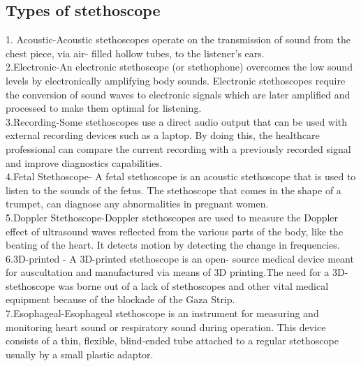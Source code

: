 \documentclass[12pt]{report}
\begin{document}
\subsection{Types of stethoscope}

 1. Acoustic-Acoustic stethoscopes operate on the  
   transmission of sound from the chest piece, via air-
   filled hollow tubes, to the listener's ears.\\
   
2.Electronic-An electronic stethoscope (or  
   stethophone)   
   overcomes the low sound levels by electronically   
   amplifying body sounds.
   Electronic stethoscopes require the conversion of   
   sound waves to electronic signals which are later 
   amplified and processed to make them optimal for 
   listening.\\

 
3.Recording-Some stethoscopes use a direct audio output 
  that can be used with external recording devices such  
  as a laptop. By doing this, the healthcare 
  professional can compare the current recording with a 
  previously recorded signal and improve diagnostics 
  capabilities.\\


4.Fetal Stethoscope- A fetal stethoscope is an acoustic 
  stethoscope that is used to listen to the sounds of  
  the fetus. The stethoscope that comes in the shape of 
  a trumpet, can diagnose any abnormalities in pregnant 
  women.\\


5.Doppler Stethoscope-Doppler stethoscopes are used to  
  measure the Doppler effect of ultrasound waves 
  reflected from the various parts of the body, like 
  the beating of the heart. It detects motion by 
  detecting the change in frequencies.\\


6.3D-printed - A 3D-printed stethoscope is an open-
  source medical device meant for auscultation and 
  manufactured via means of 3D printing.The need for a 
  3D-stethoscope was borne out of a lack of 
  stethoscopes and other vital medical equipment 
  because of the blockade of the Gaza Strip.\\


7.Esophageal-Esophageal stethoscope is an instrument 
  for measuring and monitoring heart sound or 
  respiratory sound during operation. This device 
  consists of a thin, flexible, blind-ended tube 
  attached to a regular stethoscope usually by a small 
  plastic adaptor.\\
\end{document}
